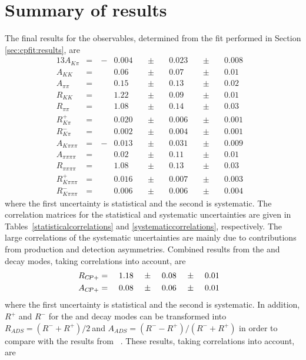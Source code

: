 \section{Summary of results}
\label{sec:cpfit:summary}

The final results for the \CP observables, determined from the \CP fit performed in Section \ref{sec:cpfit:results}, are  
\begin{alignat*}{13}
A_{K\pi} &= &\ -&0.004&\ &\pm&\ &0.023&\ &\pm&\ &0.008& \\
A_{KK} &= &&0.06&\ &\pm&\ &0.07&\ &\pm&\ &0.01& \\
A_{\pi\pi} &= &&0.15&\ &\pm&\ &0.13&\ &\pm&\ &0.02& \\
R_{KK} &= &&1.22&\ &\pm&\ &0.09&\ &\pm&\ &0.01& \\
R_{\pi\pi} &= &&1.08&\ &\pm&\ &0.14&\ &\pm&\ &0.03& \\
R^+_{K\pi} &= &&0.020&\ &\pm&\ &0.006&\ &\pm&\ &0.001& \\ 
R^-_{K\pi} &= &&0.002&\ &\pm&\ &0.004&\ &\pm&\ &0.001& \\
A_{K\pi\pi\pi} &= &\ -&0.013&\ &\pm&\ &0.031&\ &\pm&\ &0.009& \\
A_{\pi\pi\pi\pi} &= &&0.02&\ &\pm&\ &0.11&\ &\pm&\ &0.01& \\
R_{\pi\pi\pi\pi} &= &&1.08&\ &\pm&\ &0.13&\ &\pm&\ &0.03& \\
R^+_{K\pi\pi\pi} &= &&0.016&\ &\pm&\ &0.007&\ &\pm&\ &0.003& \\ 
R^-_{K\pi\pi\pi} &= &&0.006&\ &\pm&\ &0.006&\ &\pm&\ &0.004&
\end{alignat*}
where the first uncertainty is statistical and the second is systematic. The correlation matrices for the statistical and systematic uncertainties are given in Tables~\ref{statisticalcorrelations} and \ref{systematiccorrelations}, respectively. The large correlations of the systematic uncertainties are mainly due to contributions from production and detection asymmetries. Combined results from the \Kp\Km and \pip\pim decay modes, taking correlations into account, are
\begin{alignat*}{13}
R_{\CP+} &= &\ &1.18&\ &\pm&\ &0.08&\ &\pm&\ &0.01& \\
A_{\CP+} &= &\ &0.08&\ &\pm&\ &0.06&\ &\pm&\ &0.01&
\end{alignat*}
where the first uncertainty is statistical and the second is systematic. In addition, $R^+$ and $R^-$ for the \Kp\pim and \Kp\pim\pip\pim decay modes can be transformed into $R_{ADS} = \left(R^- + R^+\right)/2\ $and \mbox{$A_{ADS} = \left(R^- - R^+\right)/\left(R^- + R^+\right)$} in order to compare with the results from \babar~\cite{BaBarDKstar}. These results, taking correlations into account, are
